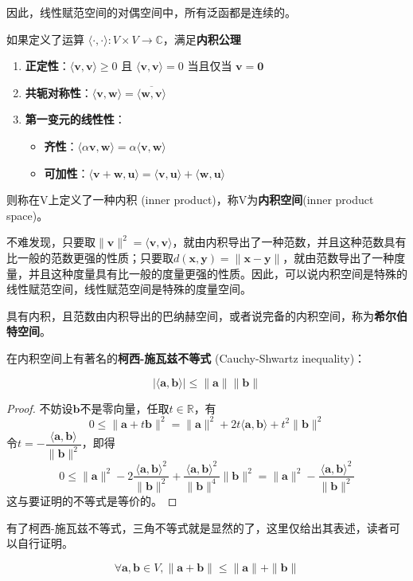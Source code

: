 \documentclass{ctexbook}
\begin{document}
因此，线性赋范空间的对偶空间中，所有泛函都是连续的。

\begin{definition}[内积]
    如果定义了运算
$\langle \cdot,\cdot\rangle:V\times V\rightarrow \mathbb{C} $，满足\textbf{内积公理}
\begin{enumerate}
    \item \textbf{正定性}：$\langle \mathbf{v}, \mathbf{v} \rangle \geq 0$ 且 $\langle \mathbf{v}, \mathbf{v} \rangle = 0$ 当且仅当 $\mathbf{v} = \mathbf{0}$
    \item \textbf{共轭对称性}：$\langle \mathbf{v}, \mathbf{w} \rangle = \overline{\langle \mathbf{w}, \mathbf{v} \rangle}$
    \item \textbf{第一变元的线性性}：
          \begin{itemize}
              \item \textbf{齐性}：$\langle \alpha \mathbf{v}, \mathbf{w} \rangle = \alpha \langle \mathbf{v}, \mathbf{w} \rangle$
              \item \textbf{可加性}：$\langle \mathbf{v} + \mathbf{w}, \mathbf{u} \rangle = \langle \mathbf{v}, \mathbf{u} \rangle + \langle \mathbf{w}, \mathbf{u} \rangle$
          \end{itemize}
\end{enumerate}
则称在V上定义了一种内积 (inner product)，称V为\textbf{内积空间}(inner product space)。
\end{definition}

不难发现，只要取$\|\mathbf{v}\|^2=\langle \mathbf{v}, \mathbf{v} \rangle$，就由内积导出了一种范数，并且这种范数具有比一般的范数更强的性质；只要取$d(\mathbf{x},\mathbf{y})=\|\mathbf{x-y}\|$，就由范数导出了一种度量，并且这种度量具有比一般的度量更强的性质。因此，可以说内积空间是特殊的线性赋范空间，线性赋范空间是特殊的度量空间。

\begin{definition}[希尔伯特空间]
    具有内积，且范数由内积导出的巴纳赫空间，或者说完备的内积空间，称为\textbf{希尔伯特空间}。
\end{definition}

在内积空间上有著名的\textbf{柯西-施瓦兹不等式} (Cauchy-Shwartz inequality)：
\begin{theorem}[柯西-施瓦兹不等式]
    \[|\langle \mathbf{a,b}\rangle| \leq \| \mathbf{a}\| \| \mathbf{b}\| \]
\end{theorem}
\begin{proof}
不妨设$\mathbf{b}$不是零向量，任取$t\in \mathbb{R}$，有
\[0\leq \|\mathbf{a}+t\mathbf{b}\|^2=\|\mathbf{a}\|^2+2t\langle\mathbf{a,b}\rangle +t^2\|\mathbf{b}\|^2\]
令$t=-\dfrac{\langle\mathbf{a,b}\rangle}{\|\mathbf{b}\|^2}$，即得
\[0\leq \|\mathbf{a}\|^2-2\frac{\langle\mathbf{a,b}\rangle^2}{\|\mathbf{b}\|^2} +\frac{\langle\mathbf{a,b}\rangle^2}{\|\mathbf{b}\|^4}\|\mathbf{b}\|^2=\|\mathbf{a}\|^2-\frac{\langle\mathbf{a,b}\rangle^2}{\|\mathbf{b}\|^2}\]
这与要证明的不等式是等价的。
\end{proof} 
有了柯西-施瓦兹不等式，三角不等式就是显然的了，这里仅给出其表述，读者可以自行证明。
\begin{proposition}[三角不等式]
    \[\forall \mathbf{a,b}\in V,\|\mathbf{a+b}\|\leq\|\mathbf{a}\|+\|\mathbf{b}\|\]
\end{proposition}
\end{document}
